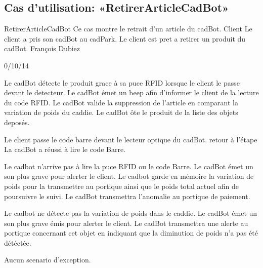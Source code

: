 \subsection{Cas d'utilisation: «RetirerArticleCadBot» }

\startCU
\nom RetirerArticleCadBot
\but Ce cas montre le retrait d'un article du cadBot.
\acteur Client
\precondition Le client a pris son cadBot au cadPark.
\declenchement Le client est pret a retirer un produit du cadBot.
\auteur François Dubiez
\date 30/10/14

\nominal %
\startnominal
\etape[SA1] Le cadBot détecte le produit grace à sa puce RFID lorsque le client le passe devant le detecteur. 
\etape[RETOUR] Le cadBot émet un beep afin d'informer le client de la lecture du code RFID.
\etape[SA3] Le cadBot valide la suppression de l'article en comparant la variation de poids du caddie.
\stopnominal
\postcondition Le cadBot ôte le produit de la liste des objets deposés.

\alternatifs %
\startalternatif[SA1] %
  \etape Le client passe le code barre devant le lecteur optique du cadBot.
  \etape retour à l'étape \in[RETOUR]
\stopcondition
\postcondition La cadBot a réussi à lire le code Barre.
\stopalternatif

\startalternatif[SA1]
   \etape Le cadbot n'arrive pas à lire la puce RFID ou le code Barre.
   \etape Le cadBot émet un son plus grave pour alerter le client.
   \etape Le cadbot garde en mémoire la variation de poids pour la transmettre au portique ainsi que le poids total actuel afin de poursuivre le suivi.
\stopcondition
\postcondition Le cadBot transmettra l'anomalie au portique de paiement.
\stopalternatif


\startalternatif[SA3]
   \etape Le cadbot ne détecte pas la variation de poids dans le caddie.
   \etape Le cadBot émet un son plus grave émis pour alerter le client.
\stopcondition
\postcondition Le cadBot transmettra une alerte au portique concernant cet objet en indiquant que la diminution de poids n'a pas été détéctée.
\stopalternatif


\exception %
Aucun scenario d'exception.
\stopCU
